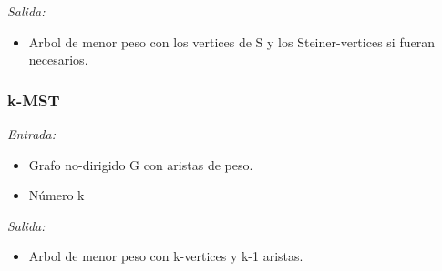 \documentclass[spanish,12pt]{elsarticle}
\begin{document}
\textit{Salida: }
\begin{itemize}
\item Arbol de menor peso con los vertices de S y los Steiner-vertices si fueran necesarios.\\
\end{itemize}
\clearpage
\subsubsection*{k-MST}
\textit{Entrada: }
\begin{itemize}
\item Grafo no-dirigido G con aristas de peso.
\item Número k
\end{itemize}

\textit{Salida: }
\begin{itemize}
\item Arbol de menor peso con k-vertices y k-1 aristas.
\end{itemize}
\end{document}
